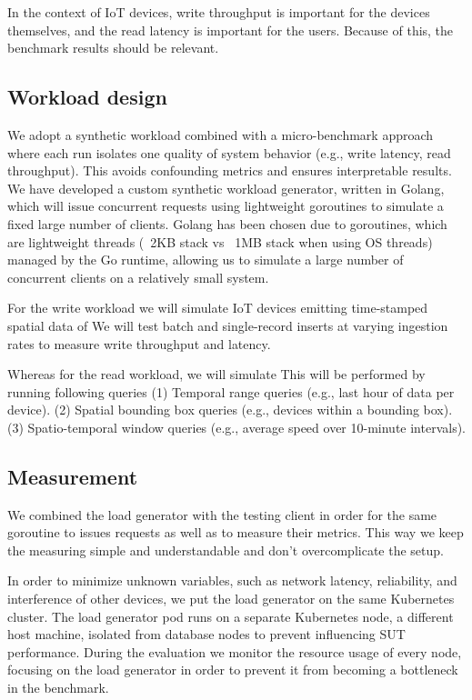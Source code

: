 In the context of IoT devices, write throughput is important for the devices themselves, and the read latency is important for the users.
Because of this, the benchmark results should be relevant.

\subsection{Workload design}
We adopt a synthetic workload combined with a micro-benchmark approach where each run isolates one quality of system behavior (e.g., write latency, read throughput).
This avoids confounding metrics and ensures interpretable results. We have developed a custom synthetic workload generator, written in Golang, which will issue concurrent requests using lightweight goroutines to simulate a fixed large number of clients.
Golang has been chosen due to goroutines, which are lightweight threads (~2KB stack vs ~1MB stack when using OS threads) managed by the Go runtime, allowing us to simulate a large number of concurrent clients on a relatively small system.

For the write workload we will simulate IoT devices emitting time-stamped spatial data of %
We will test batch and single-record inserts at varying ingestion rates to measure write throughput and latency.

Whereas for the read workload, we will simulate %
This will be performed by running following queries
(1) Temporal range queries (e.g., last hour of data per device).
(2) Spatial bounding box queries (e.g., devices within a bounding box).
(3) Spatio-temporal window queries (e.g., average speed over 10-minute intervals).

\subsection{Measurement}
We combined the load generator with the testing client in order for the same goroutine to issues requests as well as to measure their metrics.
This way we keep the measuring simple and understandable and don't overcomplicate the setup.

In order to minimize unknown variables, such as network latency, reliability, and interference of other devices, we put the load generator on the same Kubernetes cluster.
The load generator pod runs on a separate Kubernetes node, a different host machine, isolated from database nodes to prevent influencing SUT performance.
During the evaluation we monitor the resource usage of every node, focusing on the load generator in order to prevent it from becoming a bottleneck in the benchmark.






